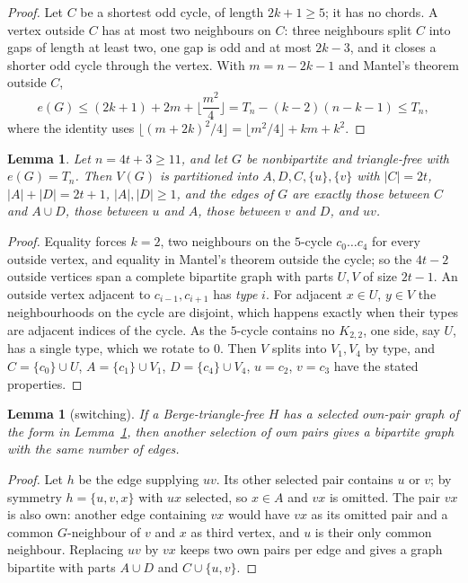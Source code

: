 \documentclass[11pt]{article}
\newtheorem{lemma}[theorem]{Lemma}
\theoremstyle{remark}
\begin{document}
\begin{proof}
Let $C$ be a shortest odd cycle, of length $2k+1\ge5$; it has no chords. A
vertex outside $C$ has at most two neighbours on $C$: three neighbours split
$C$ into gaps of length at least two, one gap is odd and at most $2k-3$, and
it closes a shorter odd cycle through the vertex. With $m=n-2k-1$ and
Mantel's theorem outside $C$,
\[
e(G)\le (2k+1)+2m+\Big\lfloor\frac{m^2}{4}\Big\rfloor
=T_n-(k-2)(n-k-1)\le T_n,
\]
where the identity uses $\lfloor (m+2k)^2/4\rfloor=\lfloor m^2/4\rfloor+km+k^2$.
\end{proof}

\begin{lemma}\label{lem:equality}
Let $n=4t+3\ge11$, and let $G$ be nonbipartite and triangle-free with
$e(G)=T_n$. Then $V(G)$ is partitioned into $A,D,C,\{u\},\{v\}$ with
$|C|=2t$, $|A|+|D|=2t+1$, $|A|,|D|\ge1$, and the edges of $G$ are exactly
those between $C$ and $A\cup D$, those between $u$ and $A$, those between
$v$ and $D$, and $uv$.
\end{lemma}

\begin{proof}
Equality forces $k=2$, two neighbours on the $5$-cycle $c_0\dots c_4$ for
every outside vertex, and equality in Mantel's theorem outside the cycle;
so the $4t-2$ outside vertices span a complete bipartite graph with parts
$U,V$ of size $2t-1$. An outside vertex adjacent to $c_{i-1},c_{i+1}$ has
\emph{type} $i$. For adjacent $x\in U$, $y\in V$ the neighbourhoods on the
cycle are disjoint, which happens exactly when their types are adjacent
indices of the cycle. As the $5$-cycle contains no $K_{2,2}$, one side, say
$U$, has a single type, which we rotate to $0$. Then $V$ splits into
$V_1,V_4$ by type, and $C=\{c_0\}\cup U$, $A=\{c_1\}\cup V_1$,
$D=\{c_4\}\cup V_4$, $u=c_2$, $v=c_3$ have the stated properties.
\end{proof}

\begin{lemma}[switching]\label{lem:switch}
If a Berge-triangle-free $H$ has a selected own-pair graph of the form in
Lemma~\ref{lem:equality}, then another selection of own pairs gives a
bipartite graph with the same number of edges.
\end{lemma}

\begin{proof}
Let $h$ be the edge supplying $uv$. Its other selected pair contains $u$ or
$v$; by symmetry $h=\{u,v,x\}$ with $ux$ selected, so $x\in A$ and $vx$ is
omitted. The pair $vx$ is also own: another edge containing $vx$ would have
$vx$ as its omitted pair and a common $G$-neighbour of $v$ and $x$ as third
vertex, and $u$ is their only common neighbour. Replacing $uv$ by $vx$
keeps two own pairs per edge and gives a graph bipartite with parts
$A\cup D$ and $C\cup\{u,v\}$.
\end{proof}
\end{document}
